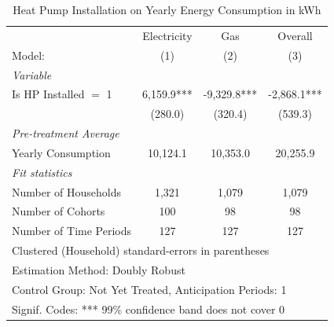 \begin{table}[htbp]
   \caption{\label{tab:hp-did-cs} Heat Pump Installation on Yearly Energy Consumption in kWh}
   \centering
   \begin{tabular}{lccc}
      \tabularnewline \midrule \midrule
                                     & Electricity     & Gas     & Overall \\   
      Model:                         & (1)              & (2)              & (3)\\  
      \midrule
      \emph{Variable}\\
      Is HP Installed $=$ 1          & 6,159.9*** & -9,329.8*** & -2,868.1***\\   
                                     & (280.0)         & (320.4)         & (539.3)\\   
      \midrule
      \emph{Pre-treatment Average}\\
      Yearly Consumption              & 10,124.1 & 10,353.0 & 20,255.9\\   
      \midrule
      \emph{Fit statistics}\\
      Number of Households                   & 1,321           & 1,079           & 1,079\\  
      Number of Cohorts              & 100              & 98              & 98\\  
      Number of Time Periods         & 127             & 127             & 127\\  
      \midrule \midrule
      \multicolumn{4}{l}{Clustered (Household) standard-errors in parentheses}\\
      \multicolumn{4}{l}{Estimation Method: Doubly Robust}\\
      \multicolumn{4}{l}{Control Group: Not Yet Treated, Anticipation Periods: 1}\\
      \multicolumn{4}{l}{Signif. Codes: *** 99\% confidence band does not cover 0}\\
   \end{tabular}
\end{table}

